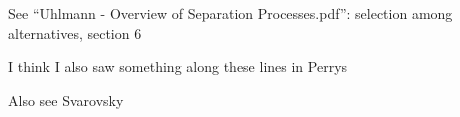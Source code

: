 See ``Uhlmann - Overview of Separation Processes.pdf'': selection among alternatives, section 6

I think I also saw something along these lines in Perrys

Also see Svarovsky